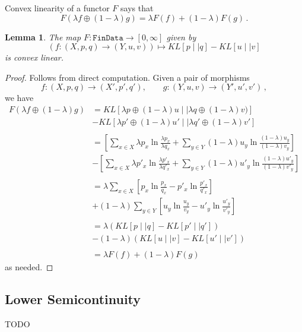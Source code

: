 \documentclass{article}
\newtheorem{lemma}{Lemma}
\begin{document}
Convex linearity of a functor $F$ says that 
$$F
(\lambda f \oplus (1-\lambda) g) = \lambda F(f) + (1-\lambda) F(g)\,.
$$

\begin{lemma}
The map $F:\texttt{FinData}\rightarrow[0, \infty]$ given by
$$
(f:(X, p, q) \rightarrow (Y, u, v)) \mapsto KL[p \mid\mid q] - KL[u \mid\mid v]
$$
is convex linear.
\end{lemma}

\begin{proof}
Follows from direct computation.
Given a pair of morphisms
$$
f:(X, p, q) \rightarrow (X', p', q'), \qquad g:(Y, u, v) \rightarrow (Y', u', v')\,,
$$
we have
\begin{align*}
  F(\lambda f \oplus (1-\lambda) g)
  &= KL[\lambda p \oplus (1-\lambda)u \mid\mid \lambda q \oplus (1-\lambda)v)] \\
  & - KL[ \lambda p' \oplus (1-\lambda)u' \mid\mid \lambda q' \oplus (1-\lambda)v'] \\
  \\
  &= \left[\sum_{x\in X} \lambda p_x \ln \frac{\lambda p_x}{\lambda q_x}  + \sum_{y\in Y} (1-\lambda) u_y \ln \frac{(1-\lambda) u_y}{(1-\lambda) v_y}\right]\\
  & - \left[\sum_{x\in X}\lambda p'_x \ln \frac{\lambda p'_x}{\lambda q'_x} +  \sum_{y\in Y}(1-\lambda)u'_y \ln \frac{(1-\lambda) u'_y}{(1-\lambda) v'_y}\right]\\
  \\
  &= \lambda \sum_{x\in X} \left[p_x \ln \frac{p_x}{q_x} -  p'_x \ln \frac{p'_x}{q'_x} \right]\\
  &+ (1-\lambda) \sum_{y\in Y} \left[u_y \ln \frac{u_y}{v_y} - u'_y \ln \frac{u'_y}{v'_y} \right]\\
  \\
  &= \lambda \left(KL[p \mid\mid q] - KL[p' \mid\mid q']\right)\\
  & - (1-\lambda) \left(KL[u \mid\mid v] - KL[u' \mid\mid v']\right) \\
  \\
  &= \lambda F(f) + (1-\lambda) F(g)
\end{align*}
as needed.
\end{proof}

\subsection{Lower Semicontinuity}
TODO
\end{document}
